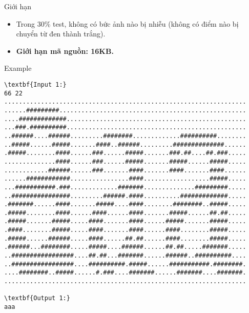 Giới hạn  
\begin{itemize}
	\item 

     Trong 30\% test, không có bức ảnh nào bị nhiễu (không có điểm nào bị chuyển từ đen thành trắng).    
	\item 

\textbf{      Giới hạn mã nguồn: 16KB.     }
\end{itemize}
   Example  
\begin{verbatim}
\textbf{Input 1:}
66 22
..................................................................
......#########...................................................
....#############.................................................
...###.##########.................................................
..######....######.........########.............##########........
..#####......#####.......####..######.........##############......
.#####........####......###......#####.......###.##....##.###.....
..............####......###......#####.......#####......#####.....
............######......###.......####.......####.......####......
......############................####..................#####.....
...###########.###.............#######..............#########.....
..################.........######.####..........#############.....
.#######......####.......#####....####........########..#####.....
.#####........####......####......####.......#####......##.##.....
.#####.......#####.....####.......####......#####.......#####.....
.####........#####.....####.......####......####........#####.....
.#####......######.....####......##.##......####........#####.....
.######...########.....#####....######......##.##.....#######.....
..#################....##.##...#######......######..##########....
..#################....##########.#####......###########.########.
....########..#####......#.###....#######......#######....#######.
..................................................................

\textbf{Output 1:}
aaa


\end{verbatim}
